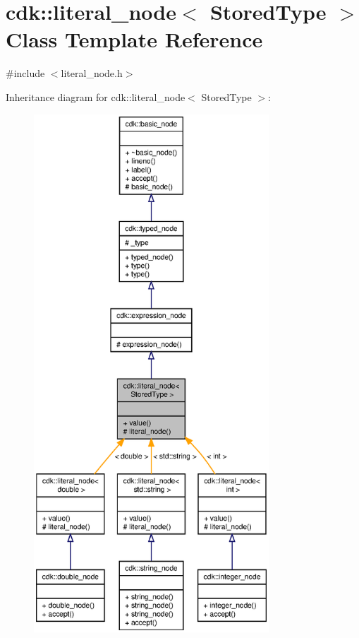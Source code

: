 \section{cdk\+:\+:literal\+\_\+node$<$ Stored\+Type $>$ Class Template Reference}
\label{classcdk_1_1literal__node}


{\ttfamily \#include $<$literal\+\_\+node.\+h$>$}



Inheritance diagram for cdk\+:\+:literal\+\_\+node$<$ Stored\+Type $>$\+:
\nopagebreak
\begin{figure}[H]
\begin{center}
\leavevmode
\includegraphics[height=550pt]{classcdk_1_1literal__node__inherit__graph}
\end{center}
\end{figure}


